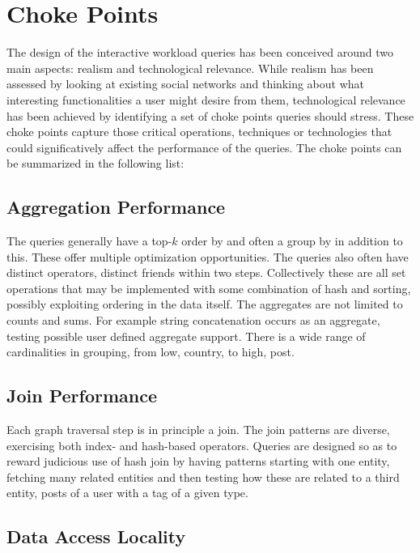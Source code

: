 \section{Choke Points}

The design of the interactive workload queries has been conceived around two
main aspects: realism and technological relevance.  While realism has been
assessed by looking at existing social networks and thinking about what
interesting functionalities a user might desire from them, technological
relevance has been achieved by identifying a set of choke points queries should
stress.  These choke points capture those critical operations, techniques or
technologies that  could significatively affect the performance of the queries.
The choke points can be summarized in the following list:


\subsection{Aggregation Performance}

The queries generally have a top-$k$ order by and often a group by in
addition to this.  These offer multiple optimization opportunities.
The queries also often have distinct operators, \ie distinct friends
within two steps.  Collectively these are all set operations that may
be implemented with some combination of hash and sorting, possibly
exploiting ordering in the data itself.  The aggregates are not
limited to counts and sums.  For example string concatenation occurs
as an aggregate, testing possible user defined aggregate support.
There is a wide range of cardinalities in grouping, from low, \eg country, to high, \eg post.

\subsection{Join Performance}

Each graph traversal step is in principle a join.  The join patterns are
diverse, exercising both index- and hash-based operators.   Queries are designed
so as to reward judicious use of hash join by having patterns starting with one
entity, fetching many related entities and then testing how these are related
to a third entity, \eg posts of a user with a tag of a given type.

\subsection{Data Access Locality}

